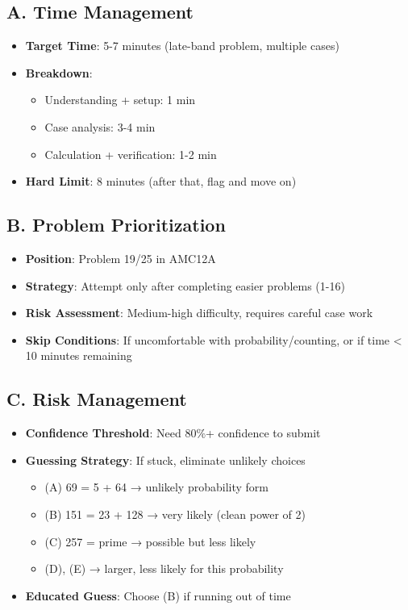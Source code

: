 \documentclass[]{article}
\begin{document}
\begin{competitionbox}
\subsection*{A. Time Management}
\begin{itemize}[leftmargin=*]
    \item \textbf{Target Time}: 5-7 minutes (late-band problem, multiple cases)
    \item \textbf{Breakdown}: 
    \begin{itemize}
        \item Understanding + setup: 1 min
        \item Case analysis: 3-4 min
        \item Calculation + verification: 1-2 min
    \end{itemize}
    \item \textbf{Hard Limit}: 8 minutes (after that, flag and move on)
\end{itemize}

\subsection*{B. Problem Prioritization}
\begin{itemize}[leftmargin=*]
    \item \textbf{Position}: Problem 19/25 in AMC12A
    \item \textbf{Strategy}: Attempt only after completing easier problems (1-16)
    \item \textbf{Risk Assessment}: Medium-high difficulty, requires careful case work
    \item \textbf{Skip Conditions}: If uncomfortable with probability/counting, or if time < 10 minutes remaining
\end{itemize}

\subsection*{C. Risk Management}
\begin{itemize}[leftmargin=*]
    \item \textbf{Confidence Threshold}: Need 80\%+ confidence to submit
    \item \textbf{Guessing Strategy}: If stuck, eliminate unlikely choices
    \begin{itemize}
        \item (A) 69 = 5 + 64 → unlikely probability form
        \item (B) 151 = 23 + 128 → very likely (clean power of 2)
        \item (C) 257 = prime → possible but less likely
        \item (D), (E) → larger, less likely for this probability
    \end{itemize}
    \item \textbf{Educated Guess}: Choose (B) if running out of time
\end{itemize}


\end{competitionbox}
\end{document}
